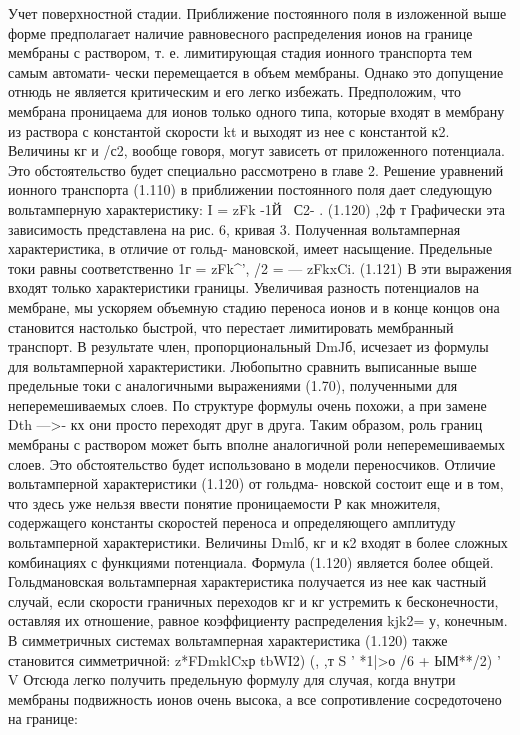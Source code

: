 Учет поверхностной стадии. Приближение постоянного поля в изложенной выше форме предполагает наличие равновесного распределения ионов на границе мембраны с раствором, т. е. лимитирующая стадия ионного транспорта тем самым автомати- 
чески перемещается в объем мембраны. Однако это допущение отнюдь не является критическим и его легко избежать. Предположим, что мембрана проницаема для ионов только одного типа, которые входят в мембрану из раствора с константой скорости kt и выходят из нее с константой к2. Величины кг и /с2, вообще говоря, могут зависеть от приложенного потенциала. Это обстоятельство будет специально рассмотрено в главе 2. Решение уравнений ионного транспорта (1.110) в приближении постоянного поля дает следующую вольтамперную характеристику:
I = zFk	-1Й~ С2- 	 .	(1.120)
,2ф
т
Графически эта зависимость представлена на рис. 6, кривая 3. Полученная вольтамперная характеристика, в отличие от гольд- мановской, имеет насыщение. Предельные токи равны соответственно
1г = zFk^', /2 = — zFkxCi.	(1.121)
В эти выражения входят только характеристики границы. Увеличивая разность потенциалов на мембране, мы ускоряем объемную стадию переноса ионов и в конце концов она становится настолько быстрой, что перестает лимитировать мембранный транспорт. В результате член, пропорциональный DmJб, исчезает из формулы для вольтамперной характеристики. Любопытно сравнить выписанные выше предельные токи с аналогичными выражениями (1.70), полученными для неперемешиваемых слоев. По структуре формулы очень похожи, а при замене Dth —>- кх они просто переходят друг в друга. Таким образом, роль границ мембраны с раствором может быть вполне аналогичной роли неперемешиваемых слоев. Это обстоятельство будет использовано в модели переносчиков.
Отличие вольтамперной характеристики (1.120) от гольдма- новской состоит еще и в том, что здесь уже нельзя ввести понятие проницаемости Р как множителя, содержащего константы скоростей переноса и определяющего амплитуду вольтамперной характеристики. Величины Dmlб, кг и к2 входят в более сложных комбинациях с функциями потенциала. Формула (1.120) является более общей. Гольдмановская вольтамперная характеристика получается из нее как частный случай, если скорости граничных переходов кг и кг устремить к бесконечности, оставляя их отношение, равное коэффициенту распределения kjk2= у, конечным.
В симметричных системах вольтамперная характеристика (1.120) также становится симметричной:
z*FDmklCxр	tbWI2)	(,	,т
S ' *1|>о /6 + ЫМ**/2) '	V
Отсюда легко получить предельную формулу для случая, когда внутри мембраны подвижность ионов очень высока, а все сопротивление сосредоточено на границе:

